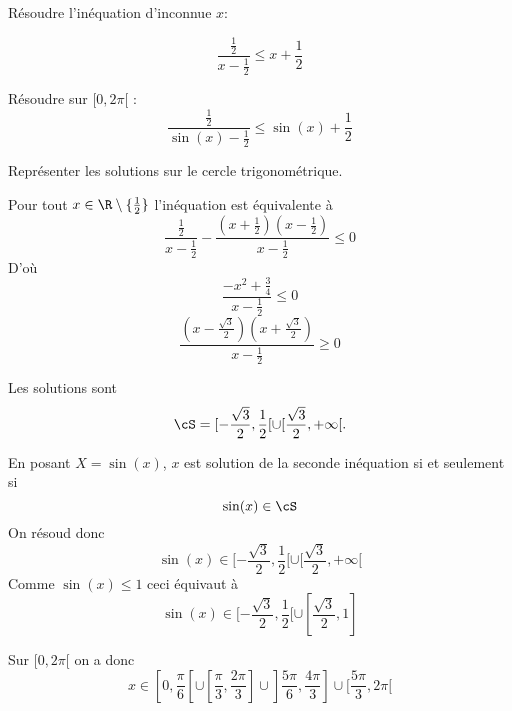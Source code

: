 




\begin{exercice}
Résoudre l'inéquation d'inconnue $x$: 

$$\frac{\frac{1}{2}}{x-\frac{1}{2}}\leq x+\frac{1}{2}$$

Résoudre sur $[0,2\pi[$ :  
$$\frac{\frac{1}{2}}{\sin(x)-\frac{1}{2}}\leq \sin(x)+\frac{1}{2}$$

Représenter les solutions sur le cercle trigonométrique. 
\end{exercice}

\begin{correction}
Pour tout $x\in \R\setminus\{ \frac{1}{2}\}$ l'inéquation est équivalente à 
$$\frac{\frac{1}{2} }{x-\frac{1}{2}} - \frac{(x+\frac{1}{2})(x-\frac{1}{2})}{x-\frac{1}{2}}\leq 0$$
D'où
$$ \frac{-x^2 +\frac{3}{4}}{x-\frac{1}{2}}\leq 0$$
$$\frac{(x-\frac{\sqrt{3}}{2})(x+\frac{\sqrt{3}}{2})}{x-\frac{1}{2}}\geq 0$$

Les solutions sont 
$$\cS  = [-\frac{\sqrt{3}}{2}, \frac{1}{2}[\cup [\frac{\sqrt{3}}{2} , +\infty[.$$

En posant $X= \sin(x)$, $x$ est solution de la seconde inéquation si et seulement si 
$$\sin(x) \in \cS$$
On résoud donc 
$$\sin(x) \in   [-\frac{\sqrt{3}}{2}, \frac{1}{2}[\cup [\frac{\sqrt{3}}{2} , +\infty[$$
Comme $\sin(x)\leq 1$ ceci équivaut à 
$$\sin(x) \in  [-\frac{\sqrt{3}}{2}, \frac{1}{2}[\cup [\frac{\sqrt{3}}{2} , 1]$$

Sur $[0, 2\pi[ $ on a donc 
$$x \in [0, \frac{\pi}{6}[\cup [\frac{\pi}{3}, \frac{2\pi}{3}]\cup ]\frac{5\pi}{6}, 
\frac{4\pi}{3}]\cup [\frac{5\pi}{3}, 2\pi[$$

\end{correction}